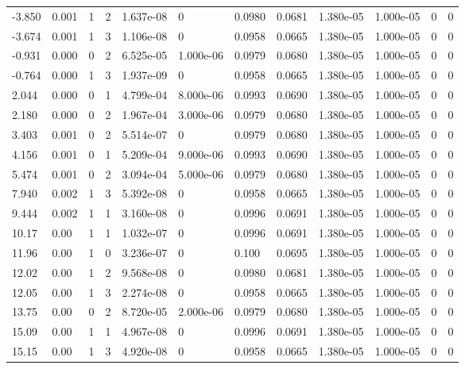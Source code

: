 \documentclass[preview]{standalone}
\begin{document}
{{\begin{tabular}{L{1.2cm}C{1.2cm} C{0.3cm}C{0.5cm} C{1.4cm}C{1.4cm} C{1.4cm}C{1.4cm} C{1.6cm}C{1.6cm} C{1.6cm}C{1.6cm}}
  -3.850  &  0.001  & 1     &  2 &  1.637e-08  & 0  &  0.0980&   0.0681& 1.380e-05 & 1.000e-05   &  0 & 0  \\ 
  -3.674  &  0.001  & 1     &  3 &  1.106e-08  & 0  &  0.0958&   0.0665& 1.380e-05 & 1.000e-05   &  0 & 0  \\ 
  -0.931  &  0.000  & 0     &  2 &  6.525e-05  & 1.000e-06  &  0.0979&   0.0680& 1.380e-05 & 1.000e-05   &  0 & 0  \\ 
  -0.764  &  0.000  & 1     &  3 &  1.937e-09  & 0  &  0.0958&   0.0665& 1.380e-05 & 1.000e-05   &  0 & 0  \\ 
  2.044  &  0.000  & 0     &  1 &  4.799e-04  & 8.000e-06  &  0.0993&   0.0690& 1.380e-05 & 1.000e-05   &  0 & 0  \\ 
  2.180  &  0.000  & 0     &  2 &  1.967e-04  & 3.000e-06  &  0.0979&   0.0680& 1.380e-05 & 1.000e-05   &  0 & 0  \\ 
  3.403  &  0.001  & 0     &  2 &  5.514e-07  & 0  &  0.0979&   0.0680& 1.380e-05 & 1.000e-05   &  0 & 0  \\ 
  4.156  &  0.001  & 0     &  1 &  5.209e-04  & 9.000e-06  &  0.0993&   0.0690& 1.380e-05 & 1.000e-05   &  0 & 0  \\ 
  5.474  &  0.001  & 0     &  2 &  3.094e-04  & 5.000e-06  &  0.0979&   0.0680& 1.380e-05 & 1.000e-05   &  0 & 0  \\ 
  7.940  &  0.002  & 1     &  3 &  5.392e-08  & 0  &  0.0958&   0.0665& 1.380e-05 & 1.000e-05   &  0 & 0  \\ 
  9.444  &  0.002  & 1     &  1 &  3.160e-08  & 0  &  0.0996&   0.0691& 1.380e-05 & 1.000e-05   &  0 & 0  \\ 
  10.17  &  0.00  & 1     &  1 &  1.032e-07  & 0  &  0.0996&   0.0691& 1.380e-05 & 1.000e-05   &  0 & 0  \\ 
  11.96  &  0.00  & 1     &  0 &  3.236e-07  & 0  &  0.100&   0.0695& 1.380e-05 & 1.000e-05   &  0 & 0  \\ 
  12.02  &  0.00  & 1     &  2 &  9.568e-08  & 0  &  0.0980&   0.0681& 1.380e-05 & 1.000e-05   &  0 & 0  \\ 
  12.05  &  0.00  & 1     &  3 &  2.274e-08  & 0  &  0.0958&   0.0665& 1.380e-05 & 1.000e-05   &  0 & 0  \\ 
  13.75  &  0.00  & 0     &  2 &  8.720e-05  & 2.000e-06  &  0.0979&   0.0680& 1.380e-05 & 1.000e-05   &  0 & 0  \\ 
  15.09  &  0.00  & 1     &  1 &  4.967e-08  & 0  &  0.0996&   0.0691& 1.380e-05 & 1.000e-05   &  0 & 0  \\ 
  15.15  &  0.00  & 1     &  3 &  4.920e-08  & 0  &  0.0958&   0.0665& 1.380e-05 & 1.000e-05   &  0 & 0  \\ 

\end{tabular}}}
\end{document}
